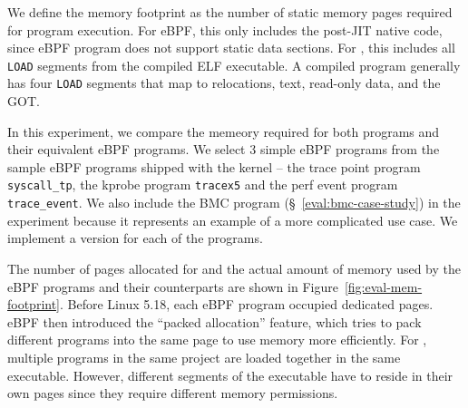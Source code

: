 We define the memory footprint as the number of static memory pages required
    for program execution.
For eBPF, this only includes the post-JIT native code, since eBPF program does
    not support static data sections.
For \projname{}, this includes all \texttt{LOAD} segments from the compiled ELF
    executable.
A compiled \projname{} program generally has four \texttt{LOAD} segments that
    map to relocations, text, read-only data, and the GOT.

In this experiment, we compare the memeory required for both
    \projname{} programs and their equivalent eBPF programs.
We select 3 simple eBPF programs from the sample eBPF programs shipped with the
    kernel -- the trace point program \texttt{syscall\_tp}, the kprobe program
    \texttt{tracex5} and the perf event program \texttt{trace\_event}.
We also include the BMC program (\S~\ref{eval:bmc-case-study}) in the
    experiment because it represents an example of a more complicated use case.
We implement a \projname{} version for each of the programs.

The number of pages allocated for and the actual amount of memory used by the
    eBPF programs and their \projname{} counterparts are shown in
    Figure~\ref{fig:eval-mem-footprint}.
Before Linux 5.18, each eBPF program occupied dedicated pages.
eBPF then introduced the ``packed allocation'' feature, which
    tries to pack different programs into the same page to use memory more
    efficiently.
For \projname{}, multiple programs in the same project are
    loaded together in the same executable.
However, different segments of the executable have to reside in their own
    pages since they require different memory permissions.

